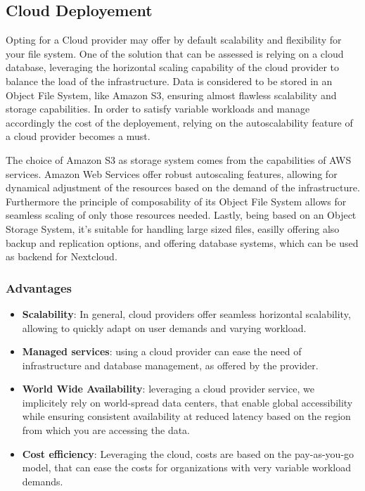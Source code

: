 \documentclass{article}
\begin{document}
	\subsection{Cloud Deployement}
	Opting for a Cloud provider may offer by default scalability and flexibility for your file system. One of the solution that can be assessed is relying on a cloud database, leveraging the horizontal scaling capability of the cloud provider to balance the load of the infrastructure.
	Data is considered to be stored in an Object File System, like Amazon S3, ensuring almost flawless scalability and storage capabilities. In order to satisfy variable workloads and manage accordingly the cost of the deployement, relying on the autoscalability feature of a cloud provider becomes a must.
	
	The choice of Amazon S3 as storage system comes from the capabilities of AWS services. Amazon Web Services offer robust autoscaling features, allowing for dynamical adjustment of the resources based on the demand of the infrastructure. Furthermore the principle of composability of its Object File System allows for seamless scaling of only those resources needed. Lastly, being based on an Object Storage System, it's suitable for handling large sized files, easilly offering also backup and replication options, and offering database systems, which can be used as backend for Nextcloud.
	
	\subsubsection{Advantages}
	\begin{itemize}
		\item \textbf{Scalability}: In general, cloud providers offer seamless horizontal scalability, allowing to quickly adapt on user demands and varying workload.
		\item \textbf{Managed services}: using a cloud provider can ease the need of infrastructure and database management, as offered by the provider.
		\item \textbf{World Wide Availability}: leveraging a cloud provider service, we implicitely rely on world-spread data centers, that enable global accessibility while ensuring consistent availability at reduced latency based on the region from which you are accessing the data.
		\item \textbf{Cost efficiency}: Leveraging the cloud, costs are based on the pay-as-you-go model, that can ease the costs for organizations with very variable workload demands.
	\end{itemize}
	
	
\end{document}
